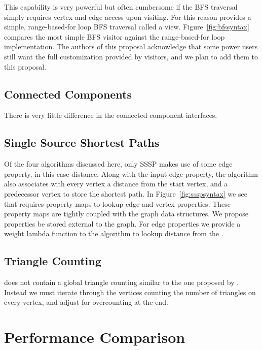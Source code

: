 This capability is very powerful but often cumbersome if the BFS traversal
simply requires vertex and edge access upon visiting.
For this reason \stdgraph provides a simple, range-based-for loop BFS traversal
called a view.
Figure~\ref{fig:bfssyntax} compares the most simple \bgl
BFS visitor against the range-based-for loop implementation.
The authors of this proposal acknowledge that some power users still want
the full customization provided by visitors,
and we plan to add them to this proposal.

\subsection{Connected Components}
There is very little difference in the connected component interfaces.

\subsection{Single Source Shortest Paths}
Of the four algorithms discussed here, only SSSP makes use of some
edge property, in this case distance.
Along with the input edge property, the algorithm also associates with
every vertex a distance from the start vertex, and a predecessor
vertex to store the shortest path.
In Figure~\ref{fig:ssspsyntax} we see that \bgl requires
property maps to lookup edge and vertex properties.
These property maps are tightly coupled with the graph data structures.
We propose properties be stored external to the graph.
For edge properties we provide a weight lambda function to the algorithm
to lookup distance from the .

\subsection{Triangle Counting}
\bgl does not contain a global triangle counting
similar to the one proposed by \stdgraph.
Instead we must iterate through the vertices counting the number of triangles
on every vertex, and adjust for overcounting at the end.

\clearpage

\section{Performance Comparison} \label{performance}
